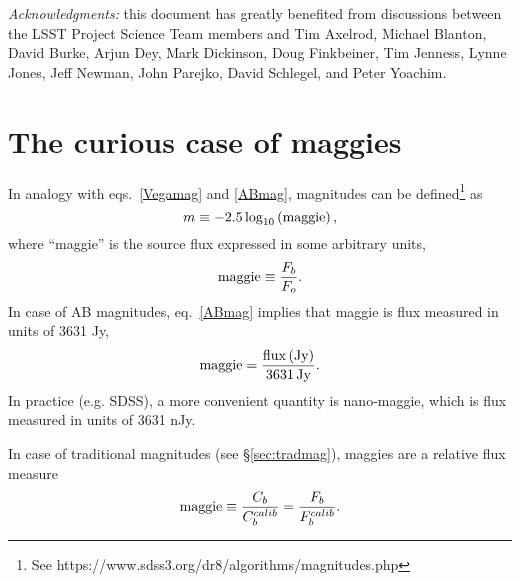 \documentclass[DM,lsstdraft,toc,usenatbib]{lsstdoc}
\begin{document}
\vskip 0.0in
\newpage
{\it Acknowledgments:} this document has greatly benefited from discussions between
the LSST Project Science Team members and Tim Axelrod, Michael Blanton, David
Burke, Arjun Dey, Mark Dickinson, Doug Finkbeiner, Tim Jenness, Lynne Jones,  Jeff Newman,
John Parejko, David Schlegel, and Peter Yoachim.


\appendix

\section{The curious case of maggies}

In analogy with eqs.~\ref{Vegamag} and \ref{ABmag}, magnitudes can be defined\footnote{
See https://www.sdss3.org/dr8/algorithms/magnitudes.php} as
\begin{equation}
\label{maggie}
               m \equiv - 2.5\log_{10}\left({\rm maggie}\right),
\end{equation}
where ``maggie'' is the source flux expressed in some arbitrary
units,
\begin{equation}
\label{maggie2}
               {\rm maggie} \equiv {F_b \over F_o}.
\end{equation}
In case of AB magnitudes, eq.~\ref{ABmag} implies that maggie is
flux measured in units of 3631 Jy,
\begin{equation}
\label{eq:defmaggie}
           {\rm maggie} = {{\rm flux \, (Jy)} \over {\rm 3631 \, Jy}}.
\end{equation}
In practice (e.g. SDSS), a more convenient
quantity is nano-maggie, which is flux measured in units of 3631 nJy.

In case of traditional magnitudes (see \S\ref{sec:tradmag}), maggies are a
relative flux measure
\begin{equation}
\label{maggie3}
    {\rm maggie} \equiv {C_b  \over C_b^{calib}} = {F_b  \over F_b^{calib}}.
\end{equation}
\end{document}
